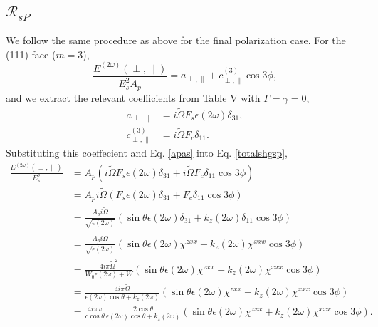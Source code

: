 \subsection{\texorpdfstring{$\mathcal{R}_{sP}$}{RsP}}
We follow the same procedure as above for the final polarization case. For the
(111) face ($m = 3$),
\begin{equation}\label{totalshgsp} %
\frac{E^{(2\omega)}(\perp,\parallel)}{E^{2}_{s}A_{p}}
    = a_{\perp,\parallel} + c^{(3)}_{\perp,\parallel}\cos3\phi,
\end{equation}
and we extract the relevant coefficients from Table V with $\Gamma=\gamma=0$,
\begin{align*}
a_{\perp,\parallel} &= i\tilde{\Omega}F_{s}\epsilon(2\omega)\delta_{31},\\
c^{(3)}_{\perp,\parallel} &= i\tilde{\Omega}F_{c}\delta_{11}.
\end{align*}
Substituting this coeffecient and Eq. \eqref{apas} into Eq. \eqref{totalshgsp},
\begin{equation*}
\begin{split}
\frac{E^{(2\omega)}(\perp,\parallel)}{E^{2}_{s}}
&= A_{p}(i\tilde{\Omega}F_{s}\epsilon(2\omega)\delta_{31}
    + i\tilde{\Omega}F_{c}\delta_{11}\cos3\phi)\\
&= A_{p}i\tilde{\Omega}(F_{s}\epsilon(2\omega)\delta_{31}
    + F_{c}\delta_{11}\cos3\phi)\\
&= \frac{A_{p}i\tilde{\Omega}}{\sqrt{\epsilon(2\omega)}}
   (
   \sin\theta\epsilon(2\omega)\delta_{31} + k_{z}(2\omega)\delta_{11}\cos3\phi
   )\\
&= \frac{A_{p}i\tilde{\Omega}}{\sqrt{\epsilon(2\omega)}}
   (
   \sin\theta\epsilon(2\omega)\chi^{zxx} + k_{z}(2\omega)\chi^{xxx}\cos3\phi
   )\\
&= \frac{4i\pi\tilde{\Omega}^{2}}{W_{0}\epsilon(2\omega) + W}
   (
   \sin\theta\epsilon(2\omega)\chi^{zxx} + k_{z}(2\omega)\chi^{xxx}\cos3\phi
   )\\
&= \frac{4i\pi\tilde{\Omega}}{\epsilon(2\omega)\cos\theta + k_{z}(2\omega)}
   (
   \sin\theta\epsilon(2\omega)\chi^{zxx} + k_{z}(2\omega)\chi^{xxx}\cos3\phi
   )\\
&= \frac{4i\pi\omega}{c\cos\theta}
   \frac{2\cos\theta}{\epsilon(2\omega)\cos\theta + k_{z}(2\omega)}
   (\sin\theta\epsilon(2\omega)\chi^{zxx} + k_{z}(2\omega)\chi^{xxx}\cos3\phi).
\end{split}
\end{equation*}

